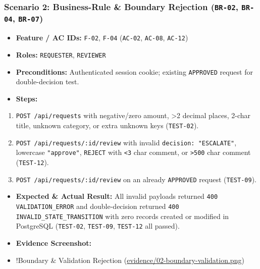 \documentclass[11pt,a4paper]{article}
\begin{document}
\subsubsection{Scenario 2: Business-Rule \& Boundary Rejection (\texttt{BR-02}, \texttt{BR-04}, \texttt{BR-07})}
\begin{itemize}[leftmargin=*,itemsep=2pt,topsep=2pt]
  \item \textbf{Feature / AC IDs:} \texttt{F-02}, \texttt{F-04} (\texttt{AC-02}, \texttt{AC-08}, \texttt{AC-12})
  \item \textbf{Roles:} \texttt{REQUESTER}, \texttt{REVIEWER}
  \item \textbf{Preconditions:} Authenticated session cookie; existing \texttt{APPROVED} request for double-decision test.
  \item \textbf{Steps:}
\end{itemize}
\begin{enumerate}[leftmargin=*,itemsep=2pt,topsep=2pt]
  \item \texttt{POST /api/requests} with negative/zero amount, >2 decimal places, 2-char title, unknown category, or extra unknown keys (\texttt{TEST-02}).
  \item \texttt{POST /api/requests/:id/review} with invalid \texttt{decision: "ESCALATE"}, lowercase \texttt{"approve"}, \texttt{REJECT} with \texttt{<3} char comment, or \texttt{>500} char comment (\texttt{TEST-12}).
  \item \texttt{POST /api/requests/:id/review} on an already \texttt{APPROVED} request (\texttt{TEST-09}).
\end{enumerate}
\begin{itemize}[leftmargin=*,itemsep=2pt,topsep=2pt]
  \item \textbf{Expected \& Actual Result:} All invalid payloads returned \texttt{400 VALIDATION\_ERROR} and double-decision returned \texttt{400 INVALID\_STATE\_TRANSITION} with zero records created or modified in PostgreSQL (\texttt{TEST-02}, \texttt{TEST-09}, \texttt{TEST-12} all passed).
  \item \textbf{Evidence Screenshot:}
  \item !Boundary \& Validation Rejection (\url{evidence/02-boundary-validation.png})
\end{itemize}
\end{document}
